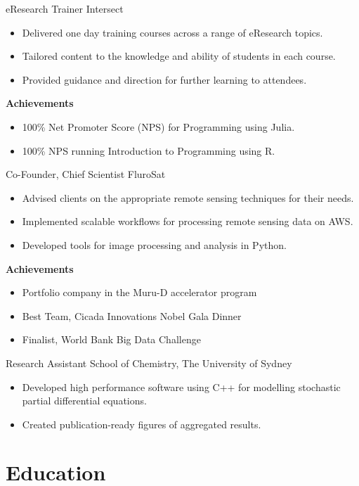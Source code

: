 {eResearch Trainer}
{Intersect}{}{}
{%
  \begin{itemize}
    \item Delivered one day training courses across a range of eResearch topics.
    \item Tailored content to the knowledge and ability of students in each
      course.
    \item Provided guidance and direction for further learning to attendees.
  \end{itemize}
  \textbf{Achievements}
  \begin{itemize}
    \item 100\% Net Promoter Score (NPS) for Programming using Julia.
    \item 100\% NPS running Introduction to Programming using R.
  \end{itemize}
}

{Co-Founder, Chief Scientist}
{FluroSat}{}{}
{%
  \begin{itemize}
    \item Advised clients on the appropriate remote sensing techniques for their
      needs.
    \item Implemented scalable workflows for processing remote sensing data on AWS.
    \item Developed tools for image processing and analysis in Python.
  \end{itemize}
  \textbf{Achievements}
  \begin{itemize}
    \item Portfolio company in the Muru-D accelerator program
    \item Best Team, Cicada Innovations Nobel Gala Dinner
    \item Finalist, World Bank Big Data Challenge
  \end{itemize}
}

{Research Assistant}
{School of Chemistry, The University of Sydney}
{}{}{%
  \begin{itemize}
    \item Developed high performance software using C++ for modelling
      stochastic partial differential equations.
    \item Created publication-ready figures of aggregated results.
  \end{itemize}
}
\vspace{1em}

\clearpage{}

\section{Education}

